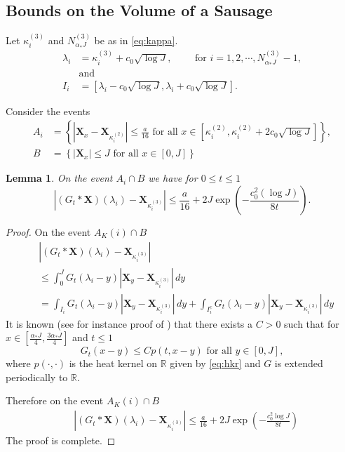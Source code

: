 \documentclass[12pt]{amsart}
\numberwithin{equation}{section}
\newtheorem{lem}{Lemma}[section]
\theoremstyle{definition}
\numberwithin{equation}{section}
\newcommand{\be}{\begin{equation}}
\newcommand{\ee}{\end{equation}}
\newcommand{\X}{\mathbf{X}}
\newcommand{\R}{\mathbb{R}}
\begin{document}
\subsection{Bounds on the Volume of a Sausage} \label{sec:bvs}
Let $ \kappa_i^{(3)}$ and $N^{(3)}_{\alpha_*J}$ be as in \eqref{eq:kappa}.
\begin{align}
  \label{eq:sp1}  \lambda_i & =  \kappa^{(3)}_i + c_0\sqrt{\log J}, \qquad \text{ for } i=1,2,\cdots,  N^{(3)}_{\alpha_*J}-1 , \nonumber\\
&\mbox{and} \nonumber \\
I_i &= \left[\lambda_i -c_0\sqrt{\log J}, \lambda_i+ c_0\sqrt{\log J}\right].
\end{align}


Consider the events 
\be \label{eq:Aki:b} 
\begin{split}
{A}_i & = \left\{|\X_x- \X_{\kappa^{(2)}_i}|\le \frac{a}{16} \text{ for all } x\in [\kappa^{(2)}_i, \kappa^{(2)}_i+2c_0\sqrt{\log J}] \right\}, \\
B &= \left\{\left |\X_x\right | \le J \text{ for all }  x\in [0,J]\right\}
\end{split}
\ee

\begin{lem}\label{lem:dconv:cm}  On the event $ A_i \cap B$ we have for $0 \leq t \leq 1$
  \be  \label{eq:dconv:cm} \left|(G_t*\X)(\lambda_i) - \X_{\kappa^{(3)}_i}\right| \le \frac{a}{16}+2J \exp\left(-\frac{c_0^2(\log J)}{8t}\right).
  \ee
\end{lem}

\begin{proof}On the event ${A}_K(i) \cap B$
\begin{align*}
&\left|(G_t*\X)(\lambda_i) - \X_{\kappa^{(3)}_i}\right| \\
&\le \int_0^{J}G_t(\lambda_i-y) |\X_y-\X_{\kappa^{(3)}_i}| \, dy \\
& = \int_{I_i}G_t(\lambda_i-y) |\X_y-\X_{\kappa^{(3)}_i}| \, dy +\int_{I_i^c}G_t(\lambda_i-y) |\X_y-\X_{\kappa^{(3)}_i}| \, dy 
\end{align*}
It is known (see for instance proof of \cite[Lemma 3.2]{athr-jose-muel}) that there exists a  $C>0$ such that for $x \in \left[\frac{\alpha_*J}{4},\frac{3\alpha_*J}{4}\right]$ and $t\le 1$
\[ G_t(x-y) \le C p(t,x-y) \text{ for all } y \in [0,J],\]
where $p(\cdot,\cdot)$ is the heat kernel on $\R$ given by \eqref{eq:hkr} and $G$ is extended periodically to $\R$.

Therefore on the event ${A}_K(i) \cap B$
\begin{align*}
&\left|(G_t*\X)(\lambda_i) - \X_{\kappa^{(3)}_i}\right| 
 \le \frac{a}{16} + 2J \exp\left(-\frac{c_0^2\log J}{8t}\right)
\end{align*}
The proof is complete.
\end{proof}
\end{document}
